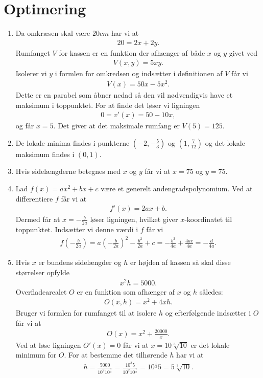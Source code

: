 \section{Optimering}
\begin{enumerate}
	
	
	\item Da omkræsen skal være $20cm$ har vi at
	\begin{align*}
	20=2x+2y.
	\end{align*}
	Rumfanget $V$ for kassen er en funktion der afhænger af både $x$ og $y$ givet ved
	\begin{align*}
	V(x,y)=5xy.
	\end{align*}
	Isolerer vi $y$ i formlen for omkredsen og indsætter i definitionen af $V$ får vi
	\begin{align*}
	V(x)=50x-5x^2.
	\end{align*}
	Dette er en parabel som åbner nedad så den vil nødvendigvis have et maksimum i toppunktet. For at finde det løser vi ligningen
	\begin{align*}
	0=v'(x)=50-10x,
	\end{align*}
	og får $x=5$. Det giver at det maksimale rumfang er $ V(5)=125 $.
	
	\item De lokale minima findes i punkterne $(-2,-\frac{5}{3})$ og $(1,\frac{7}{12})$ og det lokale maksimum findes i $(0,1)$.
	
	\item Hvis sidelængderne betegnes med $x$ og $y$ får vi at $x=75$ og $y=75$.
	
	\item Lad $f(x)=ax^2+bx+c$ være et generelt andengradspolynomium. Ved at differentiere $f$ får vi at
	\begin{align*}
	f'(x)=2ax+b.
	\end{align*}
	Dermed får at $x=-\frac{b}{2a}$ løser ligningen, hvilket giver $x$-koordinatet til toppunktet. Indsætter vi denne værdi i $f$ får vi
	\begin{align*}
	f(-\frac{b}{2a})=a(-\frac{b}{2a})^2-\frac{b^2}{2a}+c=-\frac{b^2}{4a}+\frac{4ac}{4a}=-\frac{d}{4a}.
	\end{align*}
	
	
	\item Hvis $x$ er bundens sidelængder og $h$ er højden af kassen så skal disse størrelser opfylde
	\begin{align*}
	x^2h=5000.
	\end{align*}
	Overfladearealet $O$ er en funktion som afhænger af $x$ og $h$ således:
	\begin{align*}
	O(x,h)=x^2+4xh.
	\end{align*}
	Bruger vi formlen for rumfanget til at isolere $h$ og efterfølgende indsætter i $O$ får vi at
	\begin{align*}
	O(x)=x^2+\frac{20000}{x}.
	\end{align*}
	Ved at løse ligningen $O'(x)=0$ får vi at $x=10\sqrt[3]{10}$ er det lokale minimum for $O$. For at bestemme det tilhørende $h$
	har vi at
	\begin{align*}
	h=\frac{5000}{10^2 10^{\frac{2}{3}}}=\frac{10^3 5}{10^2 10^{\frac{2}{3}}}=10^{\frac{1}{3}}5=5\sqrt[3]{10}.
	\end{align*}
	

\end{enumerate}
